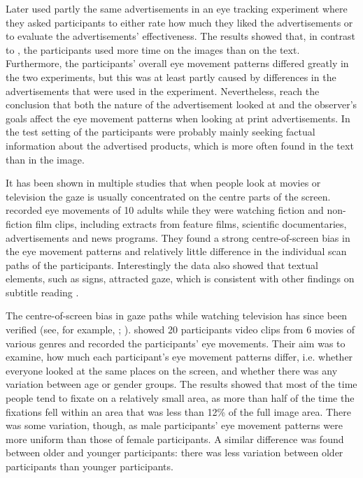 \documentclass[output=paper]{langsci/langscibook}
\begin{document}
Later \citet{rayner2008} used partly the same advertisements in an eye tracking experiment where they asked participants to either rate how much they liked the advertisements or to evaluate the advertisements’ effectiveness. The results showed that, in contrast to \citet{rayner2001}, the participants used more time on the images than on the text. Furthermore, the participants’ overall eye movement patterns differed greatly in the two experiments, but this was at least partly caused by differences in the advertisements that were used in the experiment. Nevertheless, \citet{rayner2008} reach the conclusion that both the nature of the advertisement looked at and the observer’s goals affect the eye movement patterns when looking at print advertisements. In the test setting of \citet{rayner2008} the participants were probably mainly seeking factual information about the advertised products, which is more often found in the text than in the image. 

It has been shown in multiple studies that when people look at movies or television the gaze is usually concentrated on the centre parts of the screen. \citet{tosi1997} recorded eye movements of 10 adults while they were watching fiction and non-fiction film clips, including extracts from feature films, scientific documentaries, advertisements and news programs. They found a strong centre-of-screen bias in the eye movement patterns and relatively little difference in the individual scan paths of the participants. Interestingly the data also showed that textual elements, such as signs, attracted gaze, which is consistent with other findings on subtitle reading \citep{dydewalle1987, dydewalle1991, dydewalle1992}. 

The centre-of-screen bias in gaze paths while watching television has since been verified (see, for example, \citet{goldstein2007}; \citet{brasel2008}). \citet{goldstein2007} showed 20 participants video clips from 6 movies of various genres and recorded the participants’ eye movements. Their aim was to examine, how much each participant’s eye movement patterns differ, i.e. whether everyone looked at the same places on the screen, and whether there was any variation between age or gender groups. The results showed that most of the time people tend to fixate on a relatively small area, as more than half of the time the fixations fell within an area that was less than 12\% of the full image area. There was some variation, though, as male participants’ eye movement patterns were more uniform than those of female participants. A similar difference was found between older and younger participants: there was less variation between older participants than younger participants. 
\end{document}
